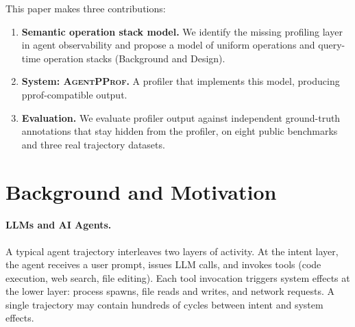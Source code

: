 \documentclass[sigconf,nonacm]{acmart}
\newcommand{\sys}{\textsc{AgentPProf}\xspace}
\begin{document}
This paper makes three contributions:

\begin{enumerate}
\item \textbf{Semantic operation stack model.}
  We identify the missing profiling layer in agent observability and
  propose a model of uniform operations and query-time operation
  stacks (Background and Design).
\item \textbf{System: \sys.}
  A profiler that implements this model, producing pprof-compatible output.
\item \textbf{Evaluation.}
  We evaluate profiler output against independent ground-truth
  annotations that stay hidden from the profiler, on eight public
  benchmarks and three real trajectory datasets.
\end{enumerate}

\section{Background and Motivation}
\label{sec:background}

\paragraph{LLMs and AI Agents.}
A typical agent trajectory interleaves two layers of activity.
At the intent layer, the agent receives a user prompt, issues LLM
calls, and invokes tools (code execution, web search, file editing).
Each tool invocation triggers system effects at the lower layer:
process spawns, file reads and writes, and network requests.
A single trajectory may contain hundreds of cycles between intent
and system effects.
\end{document}

